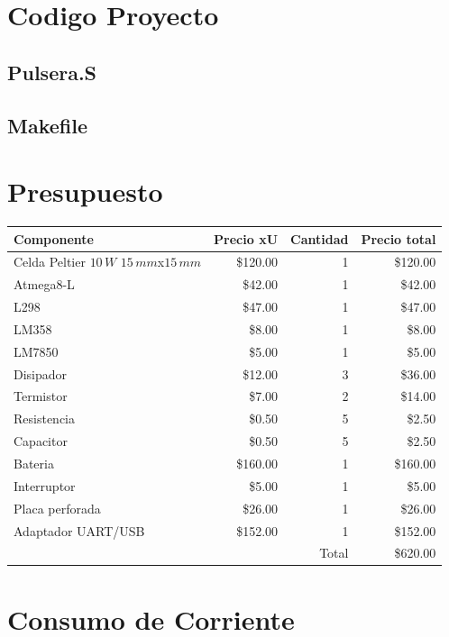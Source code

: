 \documentclass[10pt,spanish,a4paper,openany,notitlepage]{article}
\begin{document}
\newpage
\section{Codigo Proyecto}
\subsection{Pulsera.S}

\newpage
\lstset{language=Make}
\subsection{Makefile}


\newpage
\section{Presupuesto}

\begin{center}
\begin{tabular}{|l|r|r|r|}\hline
Componente&Precio xU&Cantidad&Precio total\\ \hline
Celda Peltier $10\, \unit{W}$ $15\, \unit{mm}$x$15\, \unit{mm}$ &\$120.00&1&\$120.00\\ \hline
Atmega8-L &\$42.00&1&\$42.00\\ \hline
L298 &\$47.00&1&\$47.00\\ \hline
LM358 &\$8.00&1&\$8.00\\ \hline
LM7850 &\$5.00&1&\$5.00\\ \hline
Disipador &\$12.00&3&\$36.00\\ \hline
Termistor &\$7.00&2&\$14.00\\ \hline
Resistencia &\$0.50&5&\$2.50\\ \hline
Capacitor &\$0.50&5&\$2.50\\ \hline 
Bateria &\$160.00&1&\$160.00\\ \hline
Interruptor &\$5.00&1&\$5.00\\ \hline
Placa perforada &\$26.00&1&\$26.00\\ \hline
Adaptador UART/USB & \$152.00 & 1 & \$152.00 \\ \hline 
\multicolumn{3}{|r|}{Total}&\$620.00\\ \hline
\end{tabular}
\end{center}

\section{Consumo de Corriente}
\end{document}
